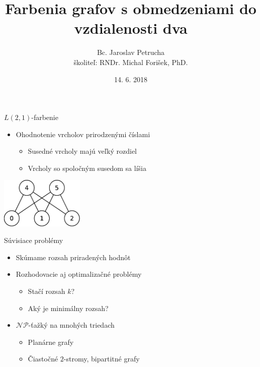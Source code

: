 \documentclass[slovak]{beamer}
\title[$L(2,1)$-farbenia grafov]{Farbenia grafov s obmedzeniami do vzdialenosti dva}
\author[Bc. Jaroslav Petrucha]{Bc. Jaroslav Petrucha \\ školiteľ: RNDr. Michal Forišek, PhD.}
\date{14. 6. 2018}
\begin{document}
\begin{frame}
\titlepage
\end{frame}

\begin{frame}{$L(2,1)$-farbenie}
    \begin{itemize}
        \item Ohodnotenie vrcholov prirodzenými číslami
        \begin{itemize}
            \item Susedné vrcholy majú veľký rozdiel
            \item Vrcholy so spoločným susedom sa líšia
        \end{itemize}
    \end{itemize}
    \begin{center}
        \includegraphics[width=0.3\textwidth]{grafy/l21-example.pdf}
    \end{center}
\end{frame}

\begin{frame}{Súvisiace problémy}
    \begin{itemize}
        \item Skúmame rozsah priradených hodnôt
        \item Rozhodovacie aj optimalizačné problémy
        \begin{itemize}
            \item Stačí rozsah $k$?
            \item Aký je minimálny rozsah?
        \end{itemize}
        \item{$\mathcal{NP}$-ťažký na mnohých triedach}
        \begin{itemize}
            \item Planárne grafy
            \item Čiastočné $2$-stromy, bipartitné grafy
        \end{itemize}
    \end{itemize}
\end{frame}
\end{document}
